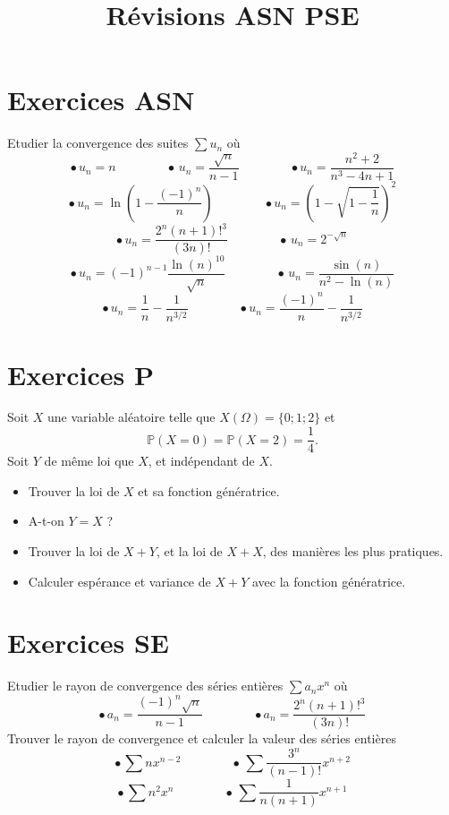 \documentclass[12pt]{article}
\title{Révisions ASN PSE}         %
\date{}                       %
\begin{document}
\maketitle                %
\tableofcontents                          %
\newpage

\section{Exercices ASN}

\noindent Etudier la convergence des suites $\sum u_n$ où 
$$ \bullet \, u_n = n \qquad \qquad  \bullet \, u_n = \frac{\sqrt{n}}{n-1} \qquad \qquad \bullet u_n = \frac{n^2+2}{n^3-4n+1}$$
$$\bullet \, u_n = \ln\left(1-\frac{(-1)^n}{n}\right) \qquad \qquad \bullet  u_n = \left(1-\sqrt{1-\frac{1}{n}}\right)^2 $$
$$ \bullet \, u_n = \frac{2^n(n+1)!^3}{(3n)!} \qquad \qquad \bullet \, u_n = 2^{-\sqrt{n}} $$
$$ \bullet \, u_n = (-1)^{n-1} \frac{\ln(n)^{10}}{\sqrt{n}} \qquad \qquad \bullet \, u_n = \frac{\sin(n)}{n^2-\ln(n)} $$
$$ \bullet \, u_n = \frac{1}{n}-\frac{1}{n^{3/2}} \qquad \qquad \bullet u_n = \frac{(-1)^n}{n}-\frac{1}{n^{3/2}}$$


\section{Exercices P}
\noindent Soit $X$ une variable aléatoire telle que $X(\Omega) = \{0;1;2\}$ et $$\mathbb{P}(X=0)=\mathbb{P}(X=2)=\frac{1}{4}.$$
Soit $Y$ de même loi que $X$, et indépendant de $X$.
\begin{itemize}
\item[$\bullet$] Trouver la loi de $X$ et sa fonction génératrice.
\item[$\bullet$] A-t-on $Y = X$ ?
\item[$\bullet$] Trouver la loi de $X+Y$, et la loi de $X+X$, des manières les plus pratiques.
\item[$\bullet$] Calculer espérance et variance de $X+Y$ avec la fonction génératrice.
\end{itemize}

\section{Exercices SE}
\noindent Etudier le rayon de convergence des séries entières $\sum a_n x^n$ où
$$ \bullet \, a_n = \frac{(-1)^n\sqrt{n}}{n-1} \qquad \qquad \bullet a_n = \frac{2^n(n+1)!^3}{(3n)!}$$
Trouver le rayon de convergence et calculer la valeur des séries entières
$$ \bullet \, \sum n x^{n-2} \qquad \qquad \bullet \, \sum  \frac{3^n}{(n-1)!}x^{n+2}$$
$$ \bullet \, \sum  n^2 x^n \qquad \qquad \bullet \, \sum  \frac{1}{n(n+1)}x^{n+1}$$
\end{document}
